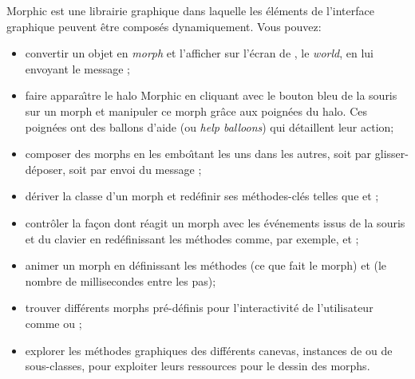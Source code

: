 \documentclass[a4paper,10pt,twoside]{book}
\begin{document}
Morphic est une librairie graphique dans laquelle les \'el\'ements de
l'interface graphique peuvent \^etre compos\'es dynamiquement.
Vous pouvez:
\begin{itemize}
  \item convertir un objet en \emph{morph} et l'afficher
    sur l'\'ecran de \pharo, le \emph{world}, en lui envoyant le message
    ;
  \item faire appara\^{\i}tre le halo Morphic en cliquant avec le
    bouton bleu de la souris sur un morph et manipuler ce morph
    gr\^ace aux poign\'ees du halo. Ces poign\'ees ont des ballons
    d'aide (ou \emph{help balloons}) qui d\'etaillent leur action;
  \item composer des morphs en les embo\^{\i}tant les uns dans les autres,
    soit par glisser-d\'eposer, soit par envoi du message ;
  \item d\'eriver la classe d'un morph et red\'efinir ses
    m\'ethodes-cl\'es telles que  et ;
  \item contr\^oler la fa\c{c}on dont r\'eagit un morph avec les
    \'ev\'enements issus de la souris et du clavier en red\'efinissant les
    m\'ethodes comme, par exemple,  et
    ;
  \item animer un morph en d\'efinissant les m\'ethodes 
    (ce que fait le morph) et  (le nombre de
    millisecondes entre les pas);
  \item trouver diff\'erents morphs pr\'e-d\'efinis pour
    l'interactivit\'e de l'utilisateur comme
     ou ;
  \item explorer les m\'ethodes graphiques des diff\'erents canevas,
    instances de  ou de sous-classes,
    pour exploiter leurs ressources pour le dessin des morphs.
\end{itemize}

\ifx\wholebook\relax\else
\end{document}
